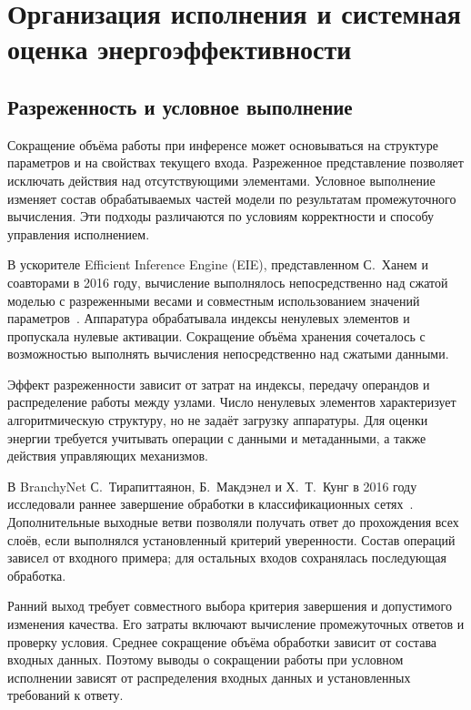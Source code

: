 \section{Организация исполнения и системная оценка энергоэффективности}

\subsection{Разреженность и условное выполнение}

Сокращение объёма работы при инференсе может основываться
на структуре параметров и на свойствах текущего входа.
Разреженное представление позволяет исключать действия
над отсутствующими элементами. Условное выполнение изменяет
состав обрабатываемых частей модели по результатам
промежуточного вычисления. Эти подходы различаются
по условиям корректности и способу управления исполнением.

В ускорителе Efficient Inference Engine (EIE), представленном С.~Ханем
и соавторами в 2016 году, вычисление выполнялось непосредственно
над сжатой моделью с разреженными весами и совместным
использованием значений параметров~\cite{han2016eie}.
Аппаратура обрабатывала индексы ненулевых элементов и пропускала нулевые
активации. Сокращение объёма хранения сочеталось с возможностью выполнять
вычисления непосредственно над сжатыми данными.

Эффект разреженности зависит от затрат на индексы,
передачу операндов и распределение работы между узлами.
Число ненулевых элементов характеризует алгоритмическую
структуру, но не задаёт загрузку аппаратуры. Для оценки
энергии требуется учитывать операции с данными и метаданными,
а также действия управляющих механизмов.

В BranchyNet С.~Тирапиттаянон, Б.~Макдэнел и Х.~Т.~Кунг
в 2016 году исследовали раннее завершение обработки
в классификационных сетях~\cite{teerapittayanon2016branchynet}.
Дополнительные выходные ветви позволяли получать ответ
до прохождения всех слоёв, если выполнялся установленный
критерий уверенности. Состав операций зависел от входного
примера; для остальных входов сохранялась последующая обработка.

Ранний выход требует совместного выбора критерия завершения
и допустимого изменения качества. Его затраты включают
вычисление промежуточных ответов и проверку условия.
Среднее сокращение объёма обработки зависит от состава
входных данных. Поэтому выводы о сокращении работы при условном исполнении зависят от
распределения входных данных и установленных требований к ответу.

